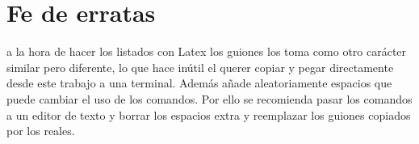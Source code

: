 \documentclass[../main.tex]{subfiles}
\begin{document}
\section{Fe de erratas}
a la hora de hacer los listados con Latex los guiones los toma como otro carácter similar pero diferente, lo que hace inútil el querer copiar y pegar directamente desde este trabajo a una terminal. Además añade aleatoriamente espacios que puede cambiar el uso de los comandos. Por ello se recomienda pasar los comandos a un editor de texto y borrar los espacios extra y reemplazar los guiones copiados por los reales. 
\end{document}
